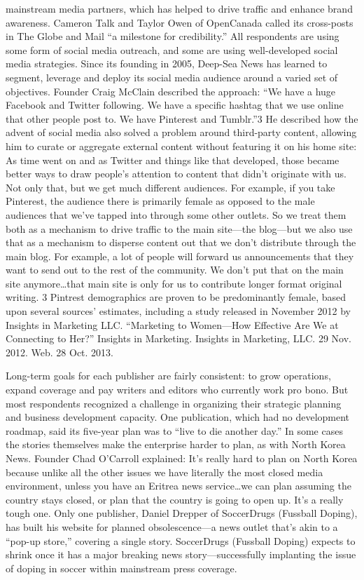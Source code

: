 mainstream media partners, which has helped to drive traffic and enhance
brand awareness. Cameron Talk and Taylor Owen of OpenCanada called its
cross-posts in The Globe and Mail ``a milestone for credibility.''
All respondents are using some form of social media outreach, and some
are using well-developed social media strategies. Since its founding in 2005,
Deep-Sea News has learned to segment, leverage and deploy its social
media audience around a varied set of objectives. Founder Craig McClain
described the approach: ``We have a huge Facebook and Twitter following.
We have a specific hashtag that we use online that other people post to. We
have Pinterest and Tumblr.''3 He described how the advent of social media
also solved a problem around third-party content, allowing him to curate or
aggregate external content without featuring it on his home site:
As time went on and as Twitter and things like that developed, those
became better ways to draw people’s attention to content that didn’t
originate with us. Not only that, but we get much different audiences.
For example, if you take Pinterest, the audience there is primarily
female as opposed to the male audiences that we’ve tapped into
through some other outlets. So we treat them both as a mechanism
to drive traffic to the main site—the blog—but we also use that as a
mechanism to disperse content out that we don’t distribute through
the main blog.
For example, a lot of people will forward us announcements that they
want to send out to the rest of the community. We don’t put that on
the main site anymore…that main site is only for us to contribute
longer format original writing.
3 Pintrest demographics are proven to be predominantly female, based upon several sources’
estimates, including a study released in November 2012 by Insights in Marketing LLC.
``Marketing to Women—How Effective Are We at Connecting to Her?'' Insights in Marketing.
Insights in Marketing, LLC. 29 Nov. 2012. Web. 28 Oct. 2013.

Long-term goals for each publisher are fairly consistent: to grow operations,
expand coverage and pay writers and editors who currently work pro bono.
But most respondents recognized a challenge in organizing their strategic
planning and business development capacity. One publication, which had no
development roadmap, said its five-year plan was to ``live to die another day.''
In some cases the stories themselves make the enterprise harder to plan, as
with North Korea News. Founder Chad O’Carroll explained:
It’s really hard to plan on North Korea because unlike all the other
issues we have literally the most closed media environment, unless
you have an Eritrea news service…we can plan assuming the country
stays closed, or plan that the country is going to open up. It’s a really
tough one.
Only one publisher, Daniel Drepper of SoccerDrugs (Fussball Doping),
has built his website for planned obsolescence—a news outlet that’s akin
to a ``pop-up store,'' covering a single story. SoccerDrugs (Fussball Doping)
expects to shrink once it has a major breaking news story—successfully
implanting the issue of doping in soccer within mainstream press coverage.


